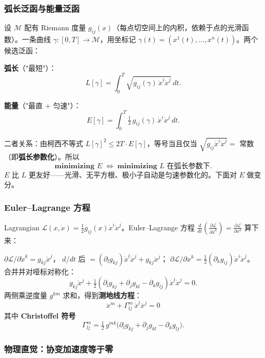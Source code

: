 \documentclass[11pt,a4paper]{article}
\theoremstyle{mythm}
\theoremstyle{mydef}
\begin{document}
\subsubsection*{弧长泛函与能量泛函}

设 $\mathcal{M}$ 配有 Riemann 度量 $g_{ij}(x)$（每点切空间上的内积，依赖于点的光滑函数）。一条曲线 $\gamma:[0,T]\to\mathcal{M}$，用坐标记 $\gamma(t) = (x^1(t),\dots,x^n(t))$。两个候选泛函：

\textbf{弧长}（"最短"）：
$$L[\gamma] = \int_0^T \sqrt{g_{ij}(\gamma)\,\dot x^i \dot x^j}\, dt.$$

\textbf{能量}（"最直 + 匀速"）：
$$E[\gamma] = \int_0^T \tfrac{1}{2}\, g_{ij}(\gamma)\,\dot x^i \dot x^j\, dt.$$

二者关系：由柯西不等式 $L[\gamma]^2 \le 2T\cdot E[\gamma]$，等号当且仅当 $\sqrt{g_{ij}\dot x^i\dot x^j} = $ 常数（即\textbf{弧长参数化}）。所以
$$\textbf{minimizing }E\;\Longleftrightarrow\;\textbf{minimizing }L\textbf{ 在弧长参数下}.$$
$E$ 比 $L$ 更友好——光滑、无平方根、极小子自动是匀速参数化的。下面对 $E$ 做变分。

\subsubsection*{Euler--Lagrange 方程}

Lagrangian $\mathcal{L}(x, \dot x) = \tfrac{1}{2} g_{ij}(x)\dot x^i \dot x^j$。Euler--Lagrange 方程
$\frac{d}{dt}\!\left(\frac{\partial \mathcal{L}}{\partial \dot x^k}\right) = \frac{\partial \mathcal{L}}{\partial x^k}$ 算下来：

$\partial \mathcal{L}/\partial \dot x^k = g_{kj}\dot x^j$，
$d/dt$ 后 $= (\partial_l g_{kj})\dot x^l\dot x^j + g_{kj}\ddot x^j$；
$\partial \mathcal{L}/\partial x^k = \tfrac{1}{2}(\partial_k g_{ij})\dot x^i \dot x^j$。
合并并对哑标对称化：
$$g_{kj}\ddot x^j + \tfrac{1}{2}(\partial_l g_{kj} + \partial_j g_{kl} - \partial_k g_{lj})\dot x^l \dot x^j = 0.$$
两侧乘逆度量 $g^{km}$ 求和，得到\textbf{测地线方程}：
\begin{equation}\label{eq:geodesic}
\boxed{\quad \ddot x^m + \Gamma^m_{lj}\,\dot x^l \dot x^j = 0\quad}
\end{equation}
其中 \textbf{Christoffel 符号}
\begin{equation}\label{eq:christoffel}
\Gamma^m_{lj} = \tfrac{1}{2}\,g^{mk}\big(\partial_l g_{kj} + \partial_j g_{kl} - \partial_k g_{lj}\big).
\end{equation}

\subsubsection*{物理直觉：协变加速度等于零}
\end{document}
